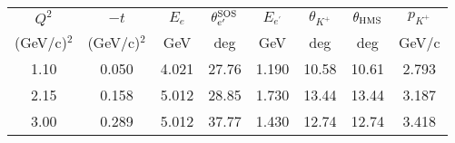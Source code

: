 \begin{center}
\label{table1}
\begin{tabular}{||c|c|c|c|c|c|c|c||}\hline
 $Q^2$ & $-t$ & $E_e$ & $\theta_{e^\prime}^{\rm SOS}$ &$E_{e^\prime}$ &
 $\theta_{K^+}$ & $\theta_{\rm HMS}$ & $p_{K^+}$ \\
 (GeV/c)$^2$ & (GeV/c)$^2$ & GeV & deg & GeV & deg & deg & GeV/c \\\hline
1.10 &0.050 &4.021 &27.76 &1.190 &10.58 &10.61 &2.793 \\
2.15 &0.158 &5.012 &28.85 &1.730 &13.44 &13.44 &3.187 \\
3.00 &0.289 &5.012 &37.77 &1.430 &12.74 &12.74 &3.418 \\\hline
\end{tabular}
\vspace{-0.5cm}
\end{center}